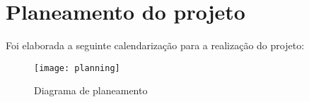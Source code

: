 \section{Planeamento do projeto} 
Foi elaborada a seguinte calendarização para a realização do projeto:

\begin{figure}[h]
	\centering
	\texttt{[image: planning]}
	\caption{Diagrama de planeamento}
\end{figure}